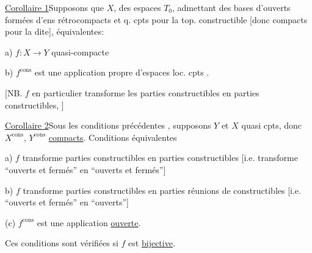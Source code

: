 
\uline{Corollaire 1}\quad Supposons que $X$,    des espaces $T_0$,  admettant des bases d'ouverts formées d'ens  rétrocompacts et q. cpts pour la top. constructible [donc compacts pour la dite],   équivalentes:

a) $f:X\longrightarrow Y$    quasi-compacte

\deleted{[\unsure{si} cpt $X$}\quad {} b) $f^{\mathrm{cons}}$ est une  application propre d'espaces loc. cpts .



[NB. $f$ en particulier transforme les parties constructibles en parties constructibles, ]

\uline{Corollaire 2}\quad Sous les conditions précédentes , supposons $Y$ et $X$ quasi cpts, donc $X^{\mathrm{cons}}$, $Y^{\mathrm{cons}}$ \uline{compacts}. Conditions équivalentes

a) $f$ transforme parties constructibles en parties constructibles [i.e. transforme ``ouverts et fermés'' en ``ouverts et fermés'']

b) $f$ transforme parties constructibles en parties réunions de constructibles [i.e. ``ouverts et fermés'' en ``ouverts'']

(c) $f^{\mathrm{cons}}$ est une application \uline{ouverte}. 

Ces conditions sont vérifiées si $f$ est \uline{bijective}.


